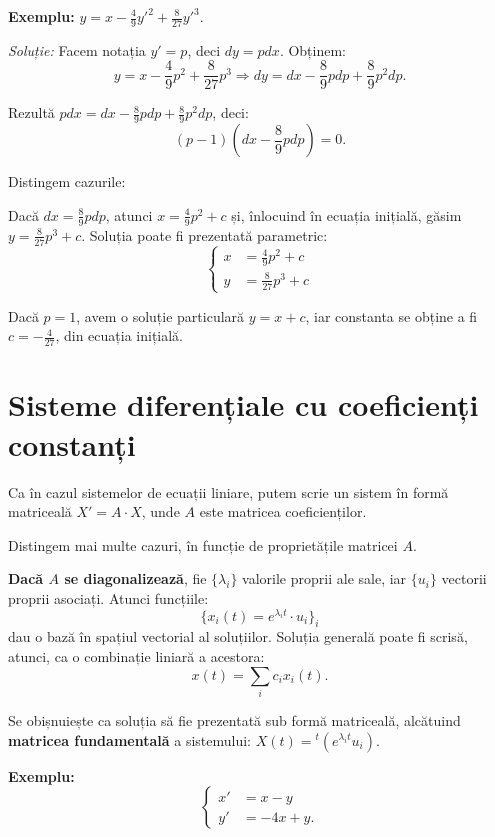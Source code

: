 \textbf{Exemplu:} $y = x - \frac{4}{9} {y'}^2 + \frac{8}{27} {y'}^3$.

\emph{Soluție:} Facem notația $y' = p$, deci $dy = pdx$. Obținem:
\[
  y = x - \frac{4}{9} p^2 + \frac{8}{27} p^3 \Rightarrow %
  dy = dx - \frac{8}{9} pdp + \frac{8}{9} p^2 dp.
\]

Rezultă $pdx = dx - \frac{8}{9} pdp + \frac{8}{9} p^2 dp$, deci:
\[
  (p - 1)(dx - \frac{8}{9} pdp) = 0.
\]

Distingem cazurile:

Dacă $dx = \frac{8}{9} pdp$, atunci $x = \frac{4}{9} p^2 + c$ și, înlocuind în
ecuația inițială, găsim $y = \frac{8}{27} p^3 + c$. Soluția poate fi prezentată parametric:
\[
  \begin{cases}
    x &= \frac{4}{9} p^2 + c \\
    y &= \frac{8}{27} p^3 + c
  \end{cases}
\]

Dacă $p = 1$, avem o soluție particulară $y = x + c$, iar constanta se obține a fi $c = -\frac{4}{27}$,
din ecuația inițială.


\section{Sisteme diferențiale cu coeficienți constanți}
\label{sec:sist-ct}

Ca în cazul sistemelor de ecuații liniare, putem scrie un sistem în formă matriceală $X' = A \cdot X$,
unde $A$ este matricea coeficienților.

Distingem mai multe cazuri, în funcție de proprietățile matricei $A$.

\textbf{Dacă $A$ se diagonalizează}, fie $\{\lambda_i\}$ valorile proprii ale sale,
iar $\{u_i\}$ vectorii proprii asociați. Atunci funcțiile:
\[
  \{ x_i(t) = e^{\lambda_i t} \cdot u_i \}_i
\]
dau o bază în spațiul vectorial al soluțiilor. Soluția generală poate fi scrisă,
atunci, ca o combinație liniară a acestora:
\[
  x(t) = \sum_i c_i x_i(t).
\]

Se obișnuiește ca soluția să fie prezentată sub formă matriceală, alcătuind
\textbf{matricea fundamentală} a sistemului: $X(t) = {}^t (e^{\lambda_i t} u_i)$.

\vspace{1cm}

\textbf{Exemplu:}
\[
  \begin{cases}
    x' &= x - y \\
    y' &= -4x + y.
  \end{cases}
\]

